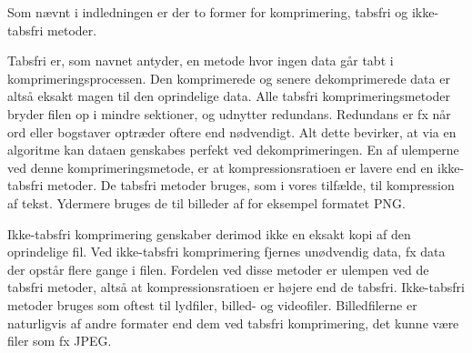 Som nævnt i indledningen er der to former for komprimering, tabsfri og ikke-tabsfri metoder. 

Tabsfri er, som navnet antyder, en metode hvor ingen data går tabt i komprimeringsprocessen. Den komprimerede og senere dekomprimerede data er altså eksakt magen til den oprindelige data. Alle tabsfri komprimeringsmetoder bryder filen op i mindre sektioner, og udnytter redundans. Redundans er fx når ord eller bogstaver optræder oftere end nødvendigt. Alt dette bevirker, at via en algoritme kan dataen genskabes perfekt ved dekomprimeringen. En af ulemperne ved denne komprimeringsmetode, er at kompressionsratioen er lavere end en ikke-tabsfri metoder\cite{wisegeek}. De tabsfri metoder bruges, som i vores tilfælde, til kompression af tekst. Ydermere bruges de til billeder af for eksempel formatet PNG. 

Ikke-tabsfri komprimering genskaber derimod ikke en eksakt kopi af den oprindelige fil. Ved ikke-tabsfri komprimering fjernes unødvendig data, fx data der opstår flere gange i filen. Fordelen ved disse metoder er ulempen ved de tabsfri metoder, altså at kompressionsratioen er højere end de tabsfri. Ikke-tabsfri metoder bruges som oftest til lydfiler, billed- og videofiler\cite{maximum}. Billedfilerne er naturligvis af andre formater end dem ved tabsfri komprimering, det kunne være filer som fx JPEG.
